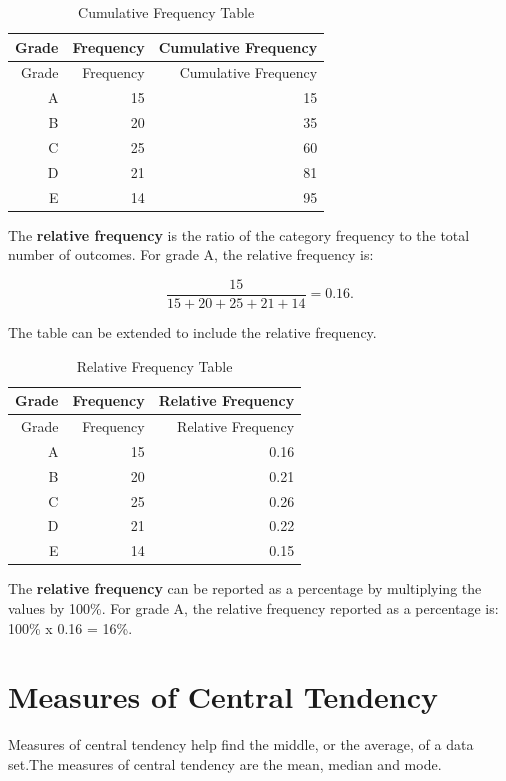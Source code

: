 \documentclass[
]{book}
\begin{document}
\begin{longtable}[]{@{}rrr@{}}
\caption{\label{tab:table3}Cumulative Frequency Table}\tabularnewline
\toprule
Grade & Frequency & Cumulative Frequency \\
\midrule
\endfirsthead
\toprule
Grade & Frequency & Cumulative Frequency \\
\midrule
\endhead
A & 15 & 15 \\
B & 20 & 35 \\
C & 25 & 60 \\
D & 21 & 81 \\
E & 14 & 95 \\
\bottomrule
\end{longtable}

The \textbf{relative frequency} is the ratio of the category frequency to the total number of outcomes. For grade A, the relative frequency is:

\[ \frac{15}{15+20+25+21+14}=0.16. \]

The table can be extended to include the relative frequency.

\begin{longtable}[]{@{}rrr@{}}
\caption{\label{tab:table4}Relative Frequency Table}\tabularnewline
\toprule
Grade & Frequency & Relative Frequency \\
\midrule
\endfirsthead
\toprule
Grade & Frequency & Relative Frequency \\
\midrule
\endhead
A & 15 & 0.16 \\
B & 20 & 0.21 \\
C & 25 & 0.26 \\
D & 21 & 0.22 \\
E & 14 & 0.15 \\
\bottomrule
\end{longtable}

The \textbf{relative frequency} can be reported as a percentage by multiplying the values by 100\%. For grade A, the relative frequency reported as a percentage is: 100\% x 0.16 = 16\%.

\hypertarget{measures-of-central-tendency}{%
\section{Measures of Central Tendency}\label{measures-of-central-tendency}}

Measures of central tendency help find the middle, or the average, of a data set.The measures of central tendency are the mean, median and mode.
\end{document}
